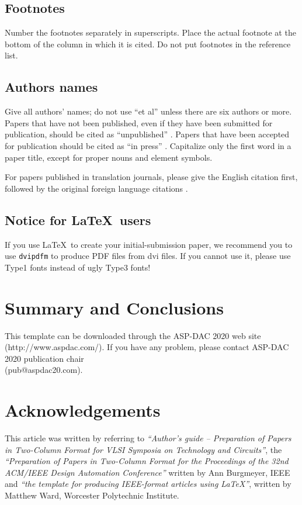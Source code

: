 \subsection{Footnotes}
Number the footnotes separately in superscripts. Place the actual
footnote at the bottom of the column in which it is cited. Do not put
footnotes in the reference list.

\subsection{Authors names}

Give all authors' names; do not use ``et al'' unless there are six
authors or more. Papers that have not been published, even if they have
been submitted for publication, should be cited as
``unpublished'' \cite{unpub}.  Papers that have been accepted for
publication should be cited as ``in press'' \cite{inpress}.
Capitalize only the first word in a paper title, except for proper nouns
and element symbols.

For papers published in translation journals, please give the English
citation first, followed by the original foreign language
citations \cite{trans}.

\subsection{Notice for \LaTeX\ users}

If you use \LaTeX\ to create your initial-submission paper, we recommend you
to use {\tt dvipdfm} to produce PDF files from dvi files. If you cannot
use it, please use Type1 fonts instead of ugly Type3 fonts!

\section{Summary and Conclusions}

This template can be downloaded through the ASP-DAC 2020 web site
(http://www.aspdac.com/). If you have any problem, please contact ASP-DAC
2020 publication chair\\
(pub@aspdac20.com).

\section*{\sc Acknowledgements}
This article was written by referring to {\em ``Author's guide --
Preparation of Papers in Two-Column Format for VLSI Symposia on
Technology and Circuits''}, the {\em ``Preparation of Papers in
Two-Column Format for the Proceedings of the 32nd ACM/IEEE Design
Automation Conference''} written by Ann Burgmeyer, IEEE and {\em ``the
template for producing IEEE-format articles using \LaTeX''}, written by
Matthew Ward, Worcester Polytechnic Institute.

